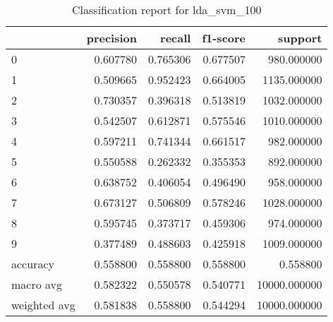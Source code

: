 \begin{table}[htb!]
\centering
\caption{Classification report for lda_svm_100}
\label{tab:classification-report-lda_svm_100}
\begin{tabular}{lrrrr}
\toprule
 & precision & recall & f1-score & support \\
\midrule
0 & 0.607780 & 0.765306 & 0.677507 & 980.000000 \\
1 & 0.509665 & 0.952423 & 0.664005 & 1135.000000 \\
2 & 0.730357 & 0.396318 & 0.513819 & 1032.000000 \\
3 & 0.542507 & 0.612871 & 0.575546 & 1010.000000 \\
4 & 0.597211 & 0.741344 & 0.661517 & 982.000000 \\
5 & 0.550588 & 0.262332 & 0.355353 & 892.000000 \\
6 & 0.638752 & 0.406054 & 0.496490 & 958.000000 \\
7 & 0.673127 & 0.506809 & 0.578246 & 1028.000000 \\
8 & 0.595745 & 0.373717 & 0.459306 & 974.000000 \\
9 & 0.377489 & 0.488603 & 0.425918 & 1009.000000 \\
accuracy & 0.558800 & 0.558800 & 0.558800 & 0.558800 \\
macro avg & 0.582322 & 0.550578 & 0.540771 & 10000.000000 \\
weighted avg & 0.581838 & 0.558800 & 0.544294 & 10000.000000 \\
\bottomrule
\end{tabular}
\end{table}
